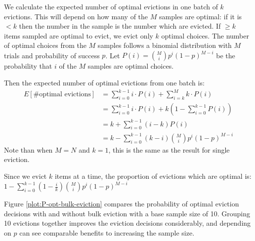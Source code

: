We calculate the expected number of optimal evictions in one batch of $k$ evictions. This will depend on how many of the $M$ samples are optimal: if it is $<k$ then the number in the sample is the number which are evicted. If $\ge k$ items sampled are optimal to evict, we evict only $k$ optimal choices. The number of optimal choices from the $M$ samples follows a binomial distribution with $M$ trials and probability of success $p$. Let $P(i) = {M \choose i} p^i (1-p)^{M-i}$ be the probability that $i$ of the $M$ samples are optimal choices.

Then the expected number of optimal evictions from one batch is:
\begin{align*}
    E[\text{\# optimal evictions}] &= \sum_{i=0}^{k-1}{i\cdot P(i)} + \sum_{i=k}^{M}{k\cdot P(i)}\\ 
    &=  \sum_{i=0}^{k-1}{i\cdot P(i)} + k\left( 1-\sum_{i=0}^{k-1}{P(i)} \right)\\
    &= k + \sum_{i=0}^{k-1}(i-k)P(i)\\
    &= k - \sum_{i=0}^{k-1}{(k-i){M \choose i}p^i (1-p)^{M-i}}
\end{align*}
Note than when $M=N$ and $k=1$, this is the same as the result for single eviction.

Since we evict $k$ items at a time, the proportion of evictions which are optimal is: $1 - \sum_{i=0}^{k-1}{\left(1 - \frac{i}{k}\right) {M \choose i} p^i (1-p)^{M-i}}$


Figure \ref{plot:P-opt-bulk-eviction} compares the probability of optimal eviction decisions with and without bulk eviction with a base sample size of 10. Grouping 10 evictions together improves the eviction decisions considerably, and depending on $p$ can see comparable benefits to increasing the sample size.


